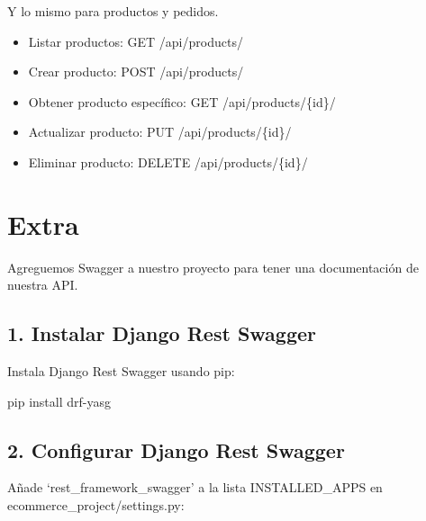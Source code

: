 \documentclass[
  a4paper,
  DIV=11,
  numbers=noendperiod,
  onepage,
  openany]{scrreprt}
\newenvironment{Shaded}{\begin{snugshade}}{\end{snugshade}}
\newcommand{\ExtensionTok}[1]{\textcolor[rgb]{0.00,0.23,0.31}{#1}}
\newcommand{\NormalTok}[1]{\textcolor[rgb]{0.00,0.23,0.31}{#1}}
\providecommand{\tightlist}{%
  \setlength{\itemsep}{0pt}\setlength{\parskip}{0pt}}\usepackage{longtable,booktabs,array}
\begin{document}
Y lo mismo para productos y pedidos.

\begin{itemize}
\tightlist
\item
  Listar productos: GET /api/products/
\item
  Crear producto: POST /api/products/
\item
  Obtener producto específico: GET /api/products/\{id\}/
\item
  Actualizar producto: PUT /api/products/\{id\}/
\item
  Eliminar producto: DELETE /api/products/\{id\}/
\end{itemize}

\chapter{Extra}\label{extra}

Agreguemos Swagger a nuestro proyecto para tener una documentación de
nuestra API.

\section{1. Instalar Django Rest
Swagger}\label{instalar-django-rest-swagger}

Instala Django Rest Swagger usando pip:

\begin{Shaded}
\begin{Highlighting}[]
\ExtensionTok{pip}\NormalTok{ install drf{-}yasg}
\end{Highlighting}
\end{Shaded}

\section{2. Configurar Django Rest
Swagger}\label{configurar-django-rest-swagger}

Añade `rest\_framework\_swagger' a la lista INSTALLED\_APPS en
ecommerce\_project/settings.py:
\end{document}
